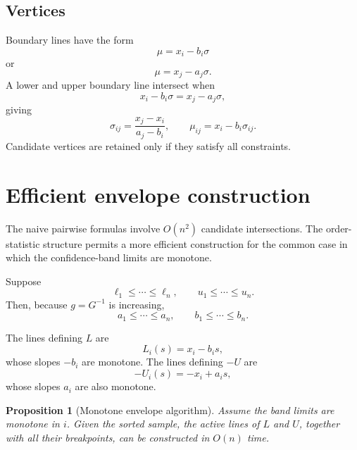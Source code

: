 \documentclass[11pt]{article}
\newtheorem{proposition}{Proposition}
\begin{document}
\subsection{Vertices}

Boundary lines have the form
\[
    \mu=x_i-b_i\sigma
\]
or
\[
    \mu=x_j-a_j\sigma.
\]
A lower and upper boundary line intersect when
\[
    x_i-b_i\sigma
    =
    x_j-a_j\sigma,
\]
giving
\begin{equation}
    \sigma_{ij}
    =
    \frac{x_j-x_i}{a_j-b_i},
    \qquad
    \mu_{ij}
    =
    x_i-b_i\sigma_{ij}.
    \label{eq:vertices}
\end{equation}
Candidate vertices are retained only if they satisfy all constraints.


\section{Efficient envelope construction}

The naive pairwise formulas involve $O(n^2)$ candidate intersections.
The order-statistic structure permits a more efficient construction for
the common case in which the confidence-band limits are monotone.

Suppose
\[
    \ell_1\leq\cdots\leq\ell_n,
    \qquad
    u_1\leq\cdots\leq u_n.
\]
Then, because $g=G^{-1}$ is increasing,
\[
    a_1\leq\cdots\leq a_n,
    \qquad
    b_1\leq\cdots\leq b_n.
\]

The lines defining $L$ are
\[
    L_i(s)=x_i-b_i s,
\]
whose slopes $-b_i$ are monotone.  The lines defining $-U$ are
\[
    -U_i(s)=-x_i+a_i s,
\]
whose slopes $a_i$ are also monotone.

\begin{proposition}[Monotone envelope algorithm]
\label{prop:envelope}
Assume the band limits are monotone in $i$.  Given the sorted sample,
the active lines of $L$ and $U$, together with all their breakpoints,
can be constructed in $O(n)$ time.
\end{proposition}
\end{document}
